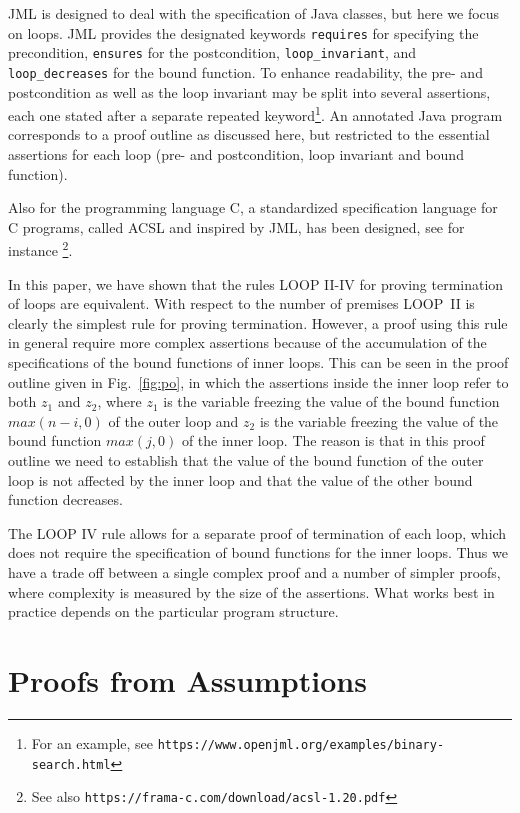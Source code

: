\documentclass[manuscript, screen, review]{acmart}
\begin{document}
JML is designed to deal with the specification of Java classes,
but here we focus on loops.
JML provides the designated keywords 
\texttt{requires} for specifying the precondition,
\texttt{ensures} for the postcondition,
\texttt{loop\_invariant}, and 
\texttt{loop\_decreases} for the bound function.
To enhance readability, the pre- and postcondition as well as the loop invariant may be split into several
assertions, each one stated after a separate repeated keyword\footnote{For an example, see 
       \texttt{https://www.openjml.org/examples/binary-search.html}}.
An annotated Java program corresponds to a proof outline as discussed here,
but restricted to the essential assertions for each loop (pre- and postcondition,
loop invariant and bound function).

Also for the programming language C, a standardized specification language for C programs, 
called ACSL and inspired by JML, has been designed, see for instance
\cite{BBBCKKMPPS21}\footnote{See also
       \texttt{https://frama-c.com/download/acsl-1.20.pdf}}.

\medskip

In this paper, we have shown that  the rules LOOP II-IV 
for proving termination of loops are equivalent.
With respect to the number of premises LOOP~II is clearly
the simplest rule for proving termination.
However,  a proof using this rule in general require more
complex assertions because of the accumulation of the
specifications of the bound functions of  inner loops.
This can be seen in the proof outline given in Fig.~\ref{fig:po}, 
in which the assertions inside the inner loop refer to both $z_1$ and $z_2$,
where $z_1$ is the variable freezing the value of the bound function $max(n-i,0)$ of the outer loop
and $z_2$ is the variable freezing the value of the bound function $max(j,0)$ of the inner loop.
The reason is that in this proof outline we need to establish 
that the value of the bound function of the outer loop is not affected 
by the inner loop and that the value of the other bound function decreases.

The LOOP IV rule allows for a separate proof of termination of each
loop, which does not require the specification of bound functions for
the inner loops.  Thus we have a trade off between a single complex
proof and a number of simpler proofs, where complexity is measured by
the size of the assertions.  What works best in practice depends on
the particular program structure.



\section{Proofs from Assumptions}
\label{sec:assumptions}
\end{document}
